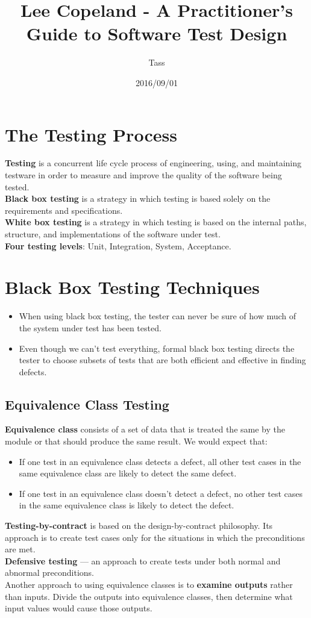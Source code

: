 \documentclass{article}
\begin{document}
\title{Lee Copeland - A Practitioner's Guide to Software Test Design}
\author{Tass}
\date{2016/09/01}
\maketitle

\newpage
\section*{The Testing Process}
\textbf{Testing} is a concurrent life cycle process of engineering, using, and maintaining testware in order to measure and improve the quality of the software being tested.
\\
\textbf{Black box testing} is a strategy in which testing is based solely on the requirements and specifications.
\\
\textbf{White box testing} is a strategy in which testing is based on the internal paths, structure, and implementations of the software under test.
\\
\textbf{Four testing levels}: Unit, Integration, System, Acceptance.

\section*{Black Box Testing Techniques}
\begin{itemize}
\item When using black box testing, the tester can never be sure of how much of the system under test has been tested.
\item Even though we can't test everything, formal black box testing directs the tester to choose subsets of tests that are both efficient and effective in finding defects.
\end{itemize}

\subsection*{Equivalence Class Testing}
\textbf{Equivalence class} consists of a set of data that is treated the same by the module or that should produce the same result. We would expect that:
\begin{itemize}
\item If one test in an equivalence class detects a defect, all other test cases in the same equivalence class are likely to detect the same defect.
\item If one test in an equivalence class doesn't detect a defect, no other test cases in the same equivalence class is likely to detect the defect.
\end{itemize}
\textbf{Testing-by-contract} is based on the design-by-contract philosophy. Its approach is to create test cases only for the situations in which the preconditions are met.
\\
\textbf{Defensive testing} --- an approach to create tests under both normal and abnormal preconditions.
\\
Another approach to using equivalence classes is to \textbf{examine outputs} rather than inputs. Divide the outputs into equivalence classes, then determine what input values would cause those outputs.
\end{document}
